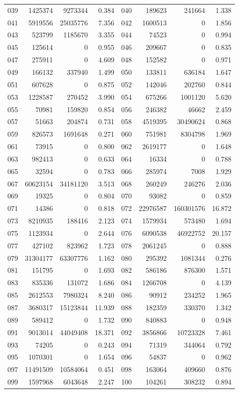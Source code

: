 \begin{longtable}{lrrr@{\hspace{16bp}}lrrr}
039 & 1425374 & 9273344 & 0.384 & 040 & 189623 & 241664 & 1.338\\
041 & 5919556 & 25035776 & 7.356 & 042 & 1600513 & 0 & 1.856\\
043 & 523799 & 1185670 & 3.355 & 044 & 74523 & 0 & 0.994\\
045 & 125614 & 0 & 0.955 & 046 & 209667 & 0 & 0.835\\
047 & 275911 & 0 & 4.609 & 048 & 152582 & 0 & 0.971\\
049 & 166132 & 337940 & 1.499 & 050 & 133811 & 636184 & 1.647\\
051 & 607628 & 0 & 0.875 & 052 & 142046 & 202760 & 0.844\\
053 & 1228587 & 270452 & 3.990 & 054 & 675266 & 1001120 & 5.620\\
055 & 70981 & 159820 & 0.854 & 056 & 246382 & 46662 & 2.459\\
057 & 51663 & 204874 & 0.731 & 058 & 4519395 & 30490624 & 0.868\\
059 & 826573 & 1691648 & 0.271 & 060 & 751981 & 8304798 & 1.969\\
061 & 73915 & 0 & 0.800 & 062 & 2619177 & 0 & 1.648\\
063 & 982413 & 0 & 0.633 & 064 & 16334 & 0 & 0.788\\
065 & 32594 & 0 & 0.783 & 066 & 285974 & 7008 & 1.929\\
067 & 60623154 & 34181120 & 3.513 & 068 & 260249 & 246276 & 2.036\\
069 & 19325 & 0 & 0.804 & 070 & 93082 & 0 & 0.859\\
071 & 14386 & 0 & 0.818 & 072 & 22976587 & 160301576 & 16.872\\
073 & 8210935 & 188416 & 2.123 & 074 & 1579934 & 573480 & 1.694\\
075 & 1123934 & 0 & 2.644 & 076 & 6090538 & 46922752 & 20.157\\
077 & 427102 & 823962 & 1.723 & 078 & 2061245 & 0 & 0.888\\
079 & 31304177 & 63307776 & 1.162 & 080 & 295392 & 1081344 & 0.276\\
081 & 151795 & 0 & 1.693 & 082 & 586186 & 876300 & 1.571\\
083 & 835336 & 131072 & 1.686 & 084 & 1266708 & 0 & 4.139\\
085 & 2612553 & 7980324 & 8.240 & 086 & 90912 & 234252 & 1.965\\
087 & 3680317 & 15123844 & 11.939 & 088 & 182359 & 330370 & 1.342\\
089 & 589412 & 0 & 1.732 & 090 & 840883 & 0 & 0.948\\
091 & 9013014 & 44049408 & 18.371 & 092 & 3856866 & 10723328 & 7.461\\
093 & 74205 & 0 & 0.243 & 094 & 71319 & 344064 & 0.792\\
095 & 1070301 & 0 & 1.654 & 096 & 54837 & 0 & 0.962\\
097 & 11491509 & 10584064 & 0.451 & 098 & 163064 & 409660 & 0.876\\
099 & 1597968 & 6043648 & 2.247 & 100 & 104261 & 308232 & 0.894\\
\end{longtable}

